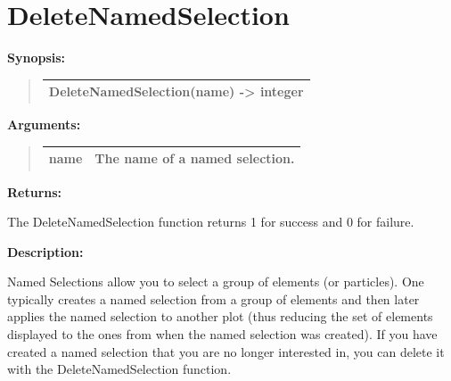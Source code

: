 \documentclass[letterpaper,10pt,english]{sphinxmanual}
\begin{document}
\section{DeleteNamedSelection}
\label{functions:deletenamedselection}
\begin{DUlineblock}{0em}
\item[] \textbf{Synopsis:}
\end{DUlineblock}
\begin{quote}

\begin{tabulary}{\linewidth}{|L|}
\hline

DeleteNamedSelection(name) -\textgreater{} integer
\\
\hline\end{tabulary}

\end{quote}

\begin{DUlineblock}{0em}
\item[] 
\item[] \textbf{Arguments:}
\end{DUlineblock}
\begin{quote}

\begin{tabulary}{\linewidth}{|L|L|}
\hline

name
 & 
The name of a named selection.
\\
\hline\end{tabulary}

\end{quote}

\begin{DUlineblock}{0em}
\item[] 
\item[] \textbf{Returns:}
\item[] The DeleteNamedSelection function returns 1 for success and 0 for failure.
\item[] 
\item[] \textbf{Description:}
\item[] Named Selections allow you to select a group of elements (or particles).
One typically creates a named selection from a group of elements and then
later applies the named selection to another plot (thus reducing the
set of elements displayed to the ones from when the named selection was
created).  If you have created a named selection that you are no longer
interested in, you can delete it with the DeleteNamedSelection function.
\end{DUlineblock}
\end{document}

